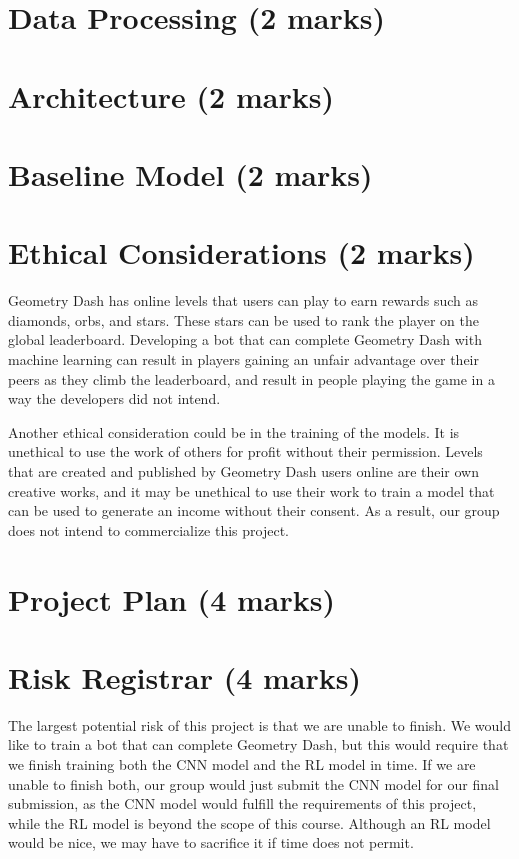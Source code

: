 \documentclass{article} %
\begin{document}
\section{Data Processing (2 marks)}

\section{Architecture (2 marks)}

\section{Baseline Model (2 marks)}

\section{Ethical Considerations (2 marks)}
Geometry Dash has online levels that users can play to earn rewards 
such as diamonds, orbs, and stars. These stars can be used to rank 
the player on the global leaderboard. Developing a bot that can complete 
Geometry Dash with machine learning can result in players gaining an 
unfair advantage over their peers as they climb the leaderboard, and 
result in people playing the game in a way the developers did not intend.

Another ethical consideration could be in the training of the models. 
It is unethical to use the work of others for profit without their 
permission. Levels that are created and published by Geometry Dash 
users online are their own creative works, and it may be unethical to 
use their work to train a model that can be used to generate an income 
without their consent. As a result, our group does not intend to 
commercialize this project.


\section{Project Plan (4 marks)}

\section{Risk Registrar (4 marks)}
The largest potential risk of this project is that we are unable to 
finish. We would like to train a bot that can complete Geometry Dash, 
but this would require that we finish training both the CNN model and 
the RL model in time. If we are unable to finish both, our group would 
just submit the CNN model for our final submission, as the CNN model 
would fulfill the requirements of this project, while the RL model is 
beyond the scope of this course. Although an RL model would be nice, 
we may have to sacrifice it if time does not permit. 
\end{document}
